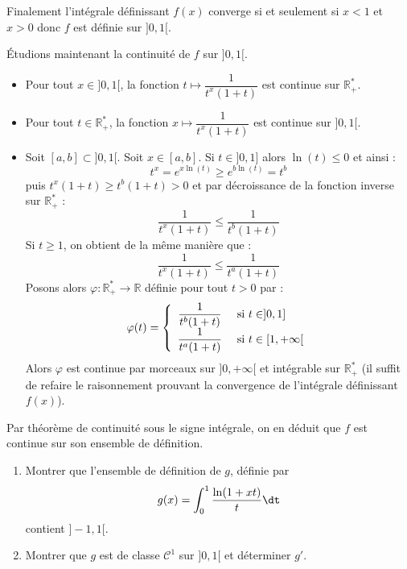 \documentclass[a4paper,10pt]{report}
\begin{document}
\medskip

\noindent Finalement l'intégrale définissant $f(x)$ converge si et seulement si $x<1$ et $x>0$ donc $f$ est définie sur $]0,1[$.

\medskip

\noindent Étudions maintenant la continuité de $f$ sur $]0,1[$.
\begin{itemize}
\item Pour tout $x \in ]0,1[$, la fonction $t \mapsto \dfrac{1}{t^x(1+t)}$ est continue sur $\mathbb{R}_+^{*}$.
\item Pour tout $t \in \mathbb{R}_+^{*}$, la fonction $x \mapsto  \dfrac{1}{t^x(1+t)}$ est continue sur $]0,1[$.
\item Soit $[a,b] \subset ]0,1[$. Soit $x \in [a,b]$. Si $t \in ]0,1]$ alors $\ln(t) \leq 0$ et ainsi :
$$ t^x = e^{x \ln(t)} \geq e^{b \ln(t)} = t^b$$
puis $t^x(1+t) \geq t^b (1+t)>0$ et par décroissance de la fonction inverse sur $\mathbb{R}_+^{*}$ :
$$ \dfrac{1}{t^x(1+t)} \leq \dfrac{1}{t^b(1+t)}$$
Si $t \geq 1$, on obtient de la même manière que :
$$  \dfrac{1}{t^x(1+t)} \leq \dfrac{1}{t^a(1+t)}$$
Posons alors $\varphi : \mathbb{R}_+^{*} \rightarrow \mathbb{R}$ définie pour tout $t>0$ par :
$$ \varphi(t) = \left\lbrace  \begin{array}{cl}
\dfrac{1}{t^b(1+t)} & \hbox{ si } t \in ]0,1] \\
\dfrac{1}{t^a(1+t)} & \hbox{ si } t \in [1, + \infty[ 
\end{array}\right.$$
Alors $\varphi$ est continue par morceaux sur $]0, + \infty[$ et intégrable sur $\mathbb{R}_+^{*}$ (il suffit de refaire le raisonnement prouvant la convergence de l'intégrale définissant $f(x)$).
\end{itemize}
Par théorème de continuité sous le signe intégrale, on en déduit que $f$ est continue sur son ensemble de définition.



\begin{Exercice}{} 
\begin{enumerate}
\item Montrer que l'ensemble de définition de $g$, définie par 
$$ g(x) = \int_{0}^1 \dfrac{\ln(1+xt)}{t} \dt$$
contient $]-1,1[$.
\item Montrer que $g$ est de classe $\mathcal{C}^1$ sur $]0,1[$ et déterminer $g'$.
\end{enumerate}
\end{Exercice}
\end{document}
